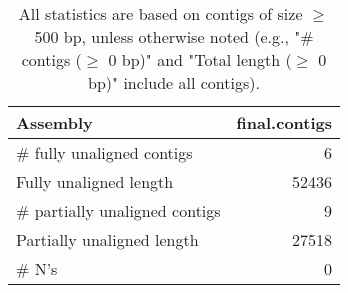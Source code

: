 \documentclass[12pt,a4paper]{article}
\begin{document}
\begin{table}[ht]
\begin{center}
\caption{All statistics are based on contigs of size $\geq$ 500 bp, unless otherwise noted (e.g., "\# contigs ($\geq$ 0 bp)" and "Total length ($\geq$ 0 bp)" include all contigs).}
\begin{tabular}{|l*{1}{|r}|}
\hline
Assembly & final.contigs \\ \hline
\# fully unaligned contigs & 6 \\ \hline
Fully unaligned length & 52436 \\ \hline
\# partially unaligned contigs & 9 \\ \hline
Partially unaligned length & 27518 \\ \hline
\# N's & 0 \\ \hline
\end{tabular}
\end{center}
\end{table}
\end{document}
